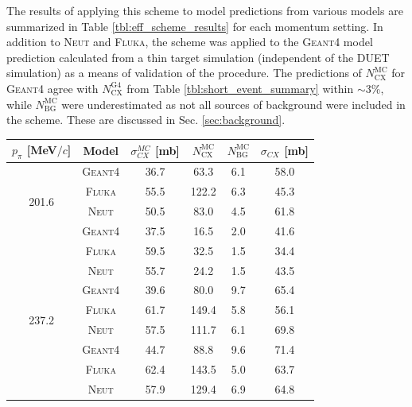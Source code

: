 {The results of applying this scheme to model predictions from various models are summarized in Table \ref{tbl:eff_scheme_results} for each momentum setting. In addition to \textsc{Neut} and \textsc{Fluka}, the scheme was applied to the \textsc{Geant4} model prediction calculated from a thin target simulation (independent of the DUET simulation) as a means of validation of the procedure. The predictions of $N_{\mathrm{CX}}^{\mathrm{MC}}$ for \textsc{Geant4} agree with $N_{\mathrm{CX}}^{\mathrm{G4}}$ from Table \ref{tbl:short_event_summary} within $\sim$3\%, while $N_{\mathrm{BG}}^{\mathrm{MC}}$ were underestimated as not all sources of background were included in the scheme. These are discussed in Sec. \ref{sec:background}.
\begin{table}[htbp]
\begin{center}
\begin{tabular}{c|c|c|c|c|c}
\hline
$p_{\pi}$ [MeV$/c$] & Model & $\sigma_{CX}^{MC}$ [mb] &  $N_{\mathrm{CX}}^{\mathrm{MC}}$  &  $N_{\mathrm{BG}}^{\mathrm{MC}}$  &  $\sigma_{CX}$ [mb] \\ \hline
\multirow{4}{*}{201.6} %
& \textsc{Geant4} & 36.7 & 63.3 & 6.1 & 58.0 \\
& \textsc{Fluka} & 55.5 & 122.2 & 6.3 & 45.3 \\
& \textsc{Neut} & 50.5 & 83.0 & 4.5 & 61.8 \\ \hline

\multirow{4}{*}{216.6} %
& \textsc{Geant4} & 37.5 & 16.5 & 2.0 & 41.6 \\
& \textsc{Fluka} & 59.5 & 32.5 & 1.5 & 34.4  \\
& \textsc{Neut} & 55.7 & 24.2 & 1.5 & 43.5 \\ \hline

\multirow{4}{*}{237.2} %
& \textsc{Geant4} & 39.6 & 80.0 & 9.7 & 65.4 \\
& \textsc{Fluka} & 61.7 & 149.4 & 5.8 & 56.1 \\
& \textsc{Neut} & 57.5 & 111.7 & 6.1 & 69.8 \\ \hline

\multirow{4}{*}{265.5} %
& \textsc{Geant4} & 44.7 & 88.8 & 9.6 & 71.4 \\
& \textsc{Fluka} & 62.4 & 143.5 & 5.0 & 63.7 \\
& \textsc{Neut} & 57.9 & 129.4 & 6.9 & 64.8 \\ \hline


\end{tabular}
\end{center}
\end{table}}
